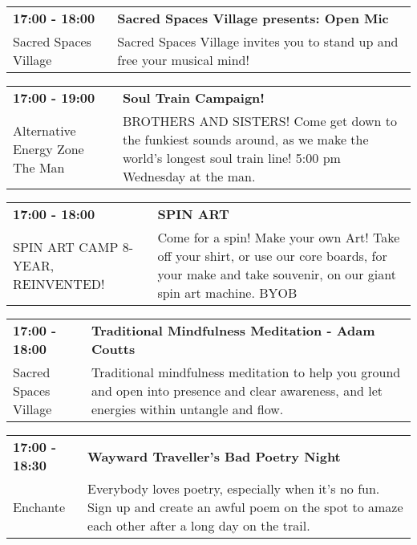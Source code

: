 \begin{tabular}{ p{1in} p{2.2in} }
    \textbf{17:00 - 18:00} & \textbf{Sacred Spaces Village presents: Open Mic} \\
    Sacred Spaces Village \newline  & Sacred Spaces Village invites you to stand up and free your musical mind! \\
    \hline 
\end{tabular}
    
\begin{tabular}{ p{1in} p{2.2in} }
    \textbf{17:00 - 19:00} & \textbf{Soul Train Campaign!} \\
    Alternative Energy Zone \newline The Man & BROTHERS AND SISTERS! Come get down to the funkiest sounds around, as we make the world's longest soul train line! 5:00 pm Wednesday at the man. \\
    \hline 
\end{tabular}
    
\begin{tabular}{ p{1in} p{2.2in} }
    \textbf{17:00 - 18:00} & \textbf{SPIN ART} \\
    SPIN ART CAMP 8-YEAR, REINVENTED! \newline  & Come for a spin! Make your own Art! Take off your shirt, or use our core boards, for your make and take souvenir, on our giant spin art machine. BYOB \\
    \hline 
\end{tabular}
    
\begin{tabular}{ p{1in} p{2.2in} }
    \textbf{17:00 - 18:00} & \textbf{Traditional Mindfulness Meditation - Adam Coutts} \\
    Sacred Spaces Village \newline  & Traditional mindfulness meditation to help you ground and open into presence and clear awareness, and let energies within untangle and flow. \\
    \hline 
\end{tabular}
    
\begin{tabular}{ p{1in} p{2.2in} }
    \textbf{17:00 - 18:30} & \textbf{Wayward Traveller's Bad Poetry Night} \\
    Enchante \newline  & Everybody loves poetry, especially when it's no fun. Sign up and create an awful poem on the spot to amaze each other after a long day on the trail. \\
    \hline 
\end{tabular}
    
